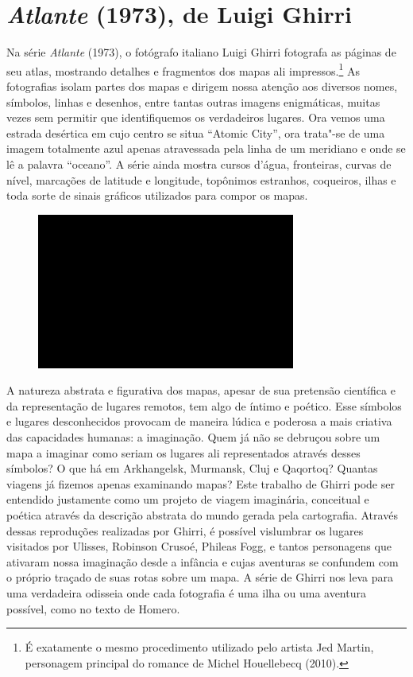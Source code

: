 \chapter{\emph{Atlante} (1973), de Luigi Ghirri}

Na série \emph{Atlante} (1973), o fotógrafo italiano Luigi Ghirri
fotografa as páginas de seu atlas, mostrando detalhes e fragmentos dos
mapas ali impressos.\footnote{É exatamente o mesmo procedimento utilizado
  pelo artista Jed Martin, personagem principal do romance de Michel
  Houellebecq {} (2010).} As fotografias
isolam partes dos mapas e dirigem nossa atenção aos diversos nomes,
símbolos, linhas e desenhos, entre tantas outras imagens enigmáticas,
muitas vezes sem permitir que identifiquemos os verdadeiros lugares. Ora
vemos uma estrada desértica em cujo centro se situa ``Atomic City'', ora
trata"-se de uma imagem totalmente azul apenas atravessada pela linha de
um meridiano e onde se lê a palavra ``oceano''. A série ainda mostra
cursos d'água, fronteiras, curvas de nível, marcações de latitude e
longitude, topônimos estranhos, coqueiros, ilhas e toda sorte de sinais
gráficos utilizados para compor os mapas.

\begin{figure}[!ht]
\centering
 \includegraphics[width=85mm]{./imgs/im1.jpg}
\caption{\tiny{}}
\end{figure}

A natureza abstrata e figurativa dos mapas, apesar de sua pretensão
científica e da representação de lugares remotos, tem algo de íntimo e
poético. Esse símbolos e lugares desconhecidos provocam de maneira
lúdica e poderosa a mais criativa das capacidades humanas: a imaginação.
Quem já não se debruçou sobre um mapa a imaginar como seriam os lugares
ali representados através desses símbolos? O que há em Arkhangelsk,
Murmansk, Cluj e Qaqortoq? Quantas viagens já fizemos apenas examinando
mapas? Este trabalho de Ghirri pode ser entendido justamente como um
projeto de viagem imaginária, conceitual e poética através da descrição
abstrata do mundo gerada pela cartografia. Através dessas reproduções
realizadas por Ghirri, é possível vislumbrar os lugares visitados por
Ulisses, Robinson Crusoé, Phileas Fogg, e tantos personagens que
ativaram nossa imaginação desde a infância e cujas aventuras se
confundem com o próprio traçado de suas rotas sobre um mapa. A série de
Ghirri nos leva para uma verdadeira odisseia onde cada fotografia é uma
ilha ou uma aventura possível, como no texto de Homero.

